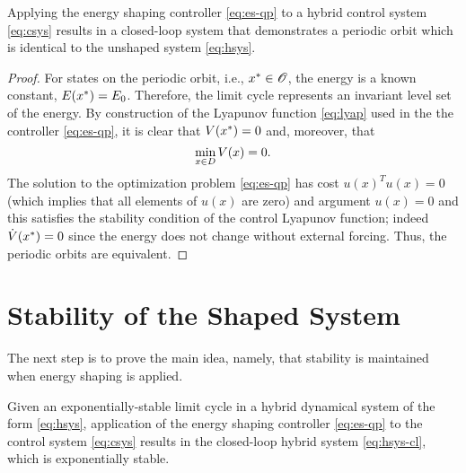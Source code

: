 \documentclass[twocolumn]{article}
\begin{document}
\begin{lemma}
  Applying the energy shaping controller \eqref{eq:es-qp} to a hybrid control system \eqref{eq:csys} results in a closed-loop system that demonstrates a periodic orbit which is identical to the unshaped system \eqref{eq:hsys}.
\end{lemma}

\begin{proof}
  For states on the periodic orbit, i.e., $x^{*} \in \mathscr{O}$, the energy is a known constant, $E(x^{*}) = E_{0}$.
  Therefore, the limit cycle represents an invariant level set of the energy.
  By construction of the Lyapunov function \eqref{eq:lyap} used in the the controller \eqref{eq:es-qp}, it is clear that $V(x^{*}) = 0$ and, moreover, that $$\min_{x \in D} V(x) = 0.$$
  The solution to the optimization problem \eqref{eq:es-qp} has cost $u(x)^T u(x) = 0$ (which implies that all elements of $u(x)$ are zero) and argument $u(x) = 0$ and this satisfies the stability condition of the control Lyapunov function; indeed ${\dot V}(x^{*}) = 0$ since the energy does not change without external forcing.
  Thus, the periodic orbits are equivalent.
\end{proof}

\section{Stability of the Shaped System}

The next step is to prove the main idea, namely, that stability is maintained when energy shaping is applied.

\begin{theorem}
  Given an exponentially-stable limit cycle in a hybrid dynamical system of the form \eqref{eq:hsys}, application of the energy shaping controller \eqref{eq:es-qp} to the control system \eqref{eq:csys} results in the closed-loop hybrid system \eqref{eq:hsys-cl}, which is exponentially stable.
\end{theorem}
\end{document}
